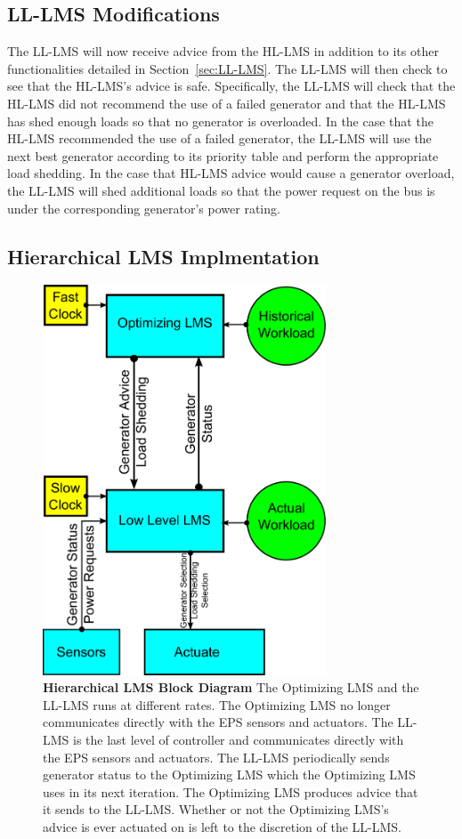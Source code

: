 \documentclass{acm_proc_article-sp}
\begin{document}
\subsection{LL-LMS Modifications}
The LL-LMS will now receive advice from the HL-LMS in addition to its other functionalities detailed in Section~\ref{sec:LL-LMS}. The LL-LMS will then
check to see that the HL-LMS's advice is safe. Specifically, the LL-LMS will check that the HL-LMS did not recommend the use of a failed generator and that
the HL-LMS has shed enough loads so that no generator is overloaded. In the case that the HL-LMS recommended the use of a failed generator, the LL-LMS
will use the next best generator according to its priority table and perform the appropriate load shedding. In the case that HL-LMS advice would cause a
generator overload, the LL-LMS will shed additional loads so that the power request on the bus is under the corresponding generator's power rating.

\subsection{Hierarchical LMS Implmentation}

\begin{figure}[hp]
  \centering
  \includegraphics[width=0.75\textwidth]{figures/H-LMS.pdf}
  \caption{\textbf{Hierarchical LMS Block Diagram} The Optimizing LMS and the LL-LMS runs at different rates. The Optimizing LMS no longer communicates directly with the EPS sensors
and actuators. The LL-LMS is the last level of controller and communicates directly with the EPS sensors and actuators. The LL-LMS periodically sends
generator status to the Optimizing LMS which the Optimizing LMS uses in its next iteration. The Optimizing LMS produces advice that it sends to the LL-LMS. Whether or not the Optimizing LMS's
advice is ever actuated on is left to the discretion of the LL-LMS.}
  \label{fig:H-LMS}
\end{figure}
\end{document}
